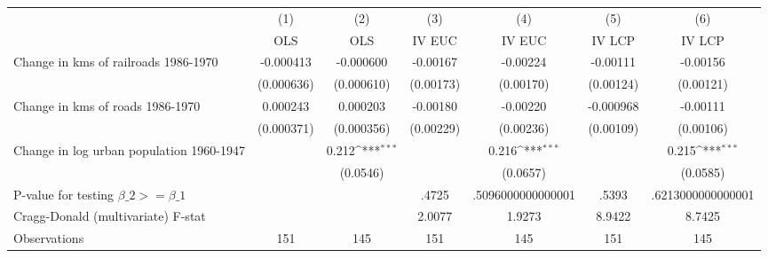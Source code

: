 {
\def\sym#1{\ifmmode^{#1}\else\(^{#1}\)\fi}
\begin{tabular}{l*{6}{c}}
\hline\hline
                &\multicolumn{1}{c}{(1)}&\multicolumn{1}{c}{(2)}&\multicolumn{1}{c}{(3)}&\multicolumn{1}{c}{(4)}&\multicolumn{1}{c}{(5)}&\multicolumn{1}{c}{(6)}\\
                &\multicolumn{1}{c}{OLS}&\multicolumn{1}{c}{OLS}&\multicolumn{1}{c}{IV EUC}&\multicolumn{1}{c}{IV EUC}&\multicolumn{1}{c}{IV LCP}&\multicolumn{1}{c}{IV LCP}\\
\hline
Change in kms of railroads 1986-1970&-0.000413         &-0.000600         & -0.00167         & -0.00224         & -0.00111         & -0.00156         \\
                &(0.000636)         &(0.000610)         &(0.00173)         &(0.00170)         &(0.00124)         &(0.00121)         \\
[1em]
Change in kms of roads 1986-1970& 0.000243         & 0.000203         & -0.00180         & -0.00220         &-0.000968         & -0.00111         \\
                &(0.000371)         &(0.000356)         &(0.00229)         &(0.00236)         &(0.00109)         &(0.00106)         \\
[1em]
Change in log urban population 1960-1947&                  &    0.212\sym{***}&                  &    0.216\sym{***}&                  &    0.215\sym{***}\\
                &                  & (0.0546)         &                  & (0.0657)         &                  & (0.0585)         \\
\hline
P-value for testing $\beta\_{2} >= \beta\_{1}$&                  &                  &    .4725         &.5096000000000001         &    .5393         &.6213000000000001         \\
Cragg-Donald (multivariate) F-stat&                  &                  &   2.0077         &   1.9273         &   8.9422         &   8.7425         \\
Observations    &      151         &      145         &      151         &      145         &      151         &      145         \\
\hline\hline
\end{tabular}
}
